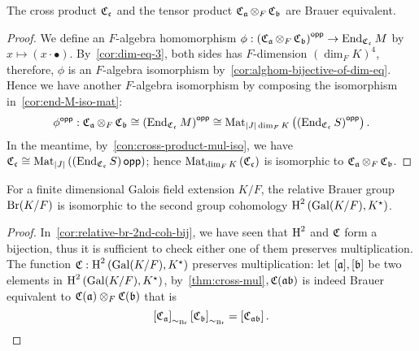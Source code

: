 \begin{theorem}\label{thm:cross-mul}
  The cross product $\cross_{\mfc}$ and the tensor product $\cross_{\mfa}\ox_{F}\cross_{\mfb}$ are Brauer equivalent.
  \leanok
\end{theorem}

\begin{proof}
  We define an $F$-algebra homomorphism $\phi : \left(\cross_{\mfa}\ox_{F}\cross_{\mfb}\right)^{\opp} \to \End_{\cross_{\mfc}}M$ by
  $x \mapsto (x \cdot \bullet)$. By~\cref{cor:dim-eq-3}, both sides has $F$-dimension $\left(\dim_{F}K\right)^{4}$, therefore, $\phi$ is an $F$-algebra isomorphism by~\cref{cor:alghom-bijective-of-dim-eq}. Hence we have another $F$-algebra isomorphism by composing the isomorphism in~\cref{cor:end-M-iso-mat}:
  \[
    \phi^{\opp}:\cross_{\mfa}\ox_{F}\cross_{\mfb}\cong \left(\End_{\cross_{\mfc}}M\right)^{\opp}\cong \mat_{|J|\dim_{F}K}\left(\left(\End_{\cross_{\mfc}}S\right)^{\opp}\right).
  \]
  In the meantime, by~\cref{con:cross-product-mul-iso}, we have $\cross_{\mfc}\cong\mat_{|J|}\left(\left(\End_{\cross_{\mfc}}S\right)\opp\right)$; hence $\mat_{\dim_{F}K}\left(\cross_{\mfc}\right)$ is isomorphic to $\cross_{\mfa}\ox_{F}\cross_{\mfb}$.
\end{proof}

\begin{corollary}
  For a finite dimensional Galois field extension $K/F$, the relative Brauer group $\br(K/F)$ is isomorphic to the second group cohomology $\HH^{2}\left(\gal(K/F),K^{\star}\right)$.
  \leanok
\end{corollary}
\begin{proof}
  In~\cref{cor:relative-br-2nd-coh-bij}, we have seen that $\HH^{2}$ and $\cross$ form a bijection, thus it is sufficient to check either one of them preserves multiplication. The function $\cross: \HH^{2}\left(\gal(K/F), K^{\star}\right)$ preserves multiplication: let $[\mfa], [\mfb]$ be two elements in $\HH^{2}\left(\gal(K/F), K^{\star}\right)$, by~\cref{thm:cross-mul}$, \cross(\mfa\mfb)$ is indeed Brauer equivalent to $\cross(\mfa)\ox_{F}\cross(\mfb)$ that is
  \[
    \left[\cross_{\mfa}\right]_{\sim_{\br}}\left[\cross_{\mfb}\right]_{\sim_{\br}} = \left[\cross_{\mfa\mfb}\right].
  \]
\end{proof}




